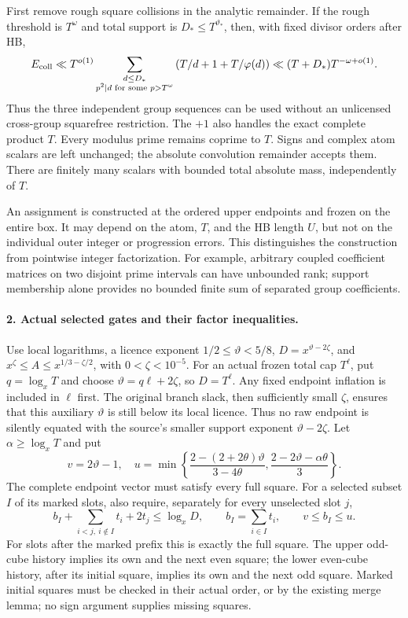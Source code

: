 First remove rough square collisions in the analytic remainder. If the
rough threshold is $T^\omega$ and total support is $D_*\le T^{\vartheta_*}$,
then, with fixed divisor orders after HB,
\[
 E_{\rm coll}\ll T^{o(1)}
 \sum_{\substack{d\le D_*\\p^2\mid d\text{ for some }p>T^\omega}}
 \left(T/d+1+T/\varphi(d)\right)
 \ll (T+D_*)T^{-\omega+o(1)}.
\]
Thus the three independent group sequences can be used without an
unlicensed cross-group squarefree restriction. The $+1$ also handles
the exact complete product $T$. Every modulus prime remains coprime to
$T$. Signs and complex atom scalars are left unchanged; the absolute
convolution remainder accepts them. There are finitely many scalars with
bounded total absolute mass, independently of $T$.

An assignment is constructed at the ordered upper endpoints and frozen
on the entire box. It may depend on the atom, $T$, and the HB length $U$,
but not on the individual outer integer or progression errors. This
distinguishes the construction from pointwise integer factorization.
For example, arbitrary coupled coefficient matrices on two disjoint
prime intervals can have unbounded rank; support membership alone
provides no bounded finite sum of separated group coefficients.

\paragraph{2. Actual selected gates and their factor inequalities.}
Use local logarithms, a licence exponent $1/2\le\vartheta<5/8$,
$D=x^{\vartheta-2\zeta}$, and
$x^\zeta\le A\le x^{1/3-\zeta/2}$, with $0<\zeta<10^{-5}$.
For an actual frozen total cap $T^\ell$, put $q=\log_xT$ and choose
$\vartheta=q\ell+2\zeta$, so $D=T^\ell$. Any fixed endpoint inflation
is included in $\ell$ first. The original branch slack, then sufficiently
small $\zeta$, ensures that this auxiliary $\vartheta$ is still below
its local licence. Thus no raw endpoint is silently equated with the
source's smaller support exponent $\vartheta-2\zeta$.
Let $\alpha\ge\log_x T$ and put
\[
 v=2\vartheta-1,\quad
 u=\min\left\{\frac{2-(2+2\theta)\vartheta}{3-4\theta},
                 \frac{2-2\vartheta-\alpha\theta}{3}\right\}.
\]
The complete endpoint vector must satisfy every full square. For a
selected subset $I$ of its marked slots, also require, separately for
every unselected slot $j$,
\[
 b_I+\sum_{i<j,\ i\notin I}t_i+2t_j\le\log_xD,
 \qquad b_I=\sum_{i\in I}t_i,\qquad v\le b_I\le u.       \tag{H1}
\]
For slots after the marked prefix this is exactly the full square.
The upper odd-cube history implies its own and the next even square;
the lower even-cube history, after its initial square, implies its own
and the next odd square. Marked initial squares must be checked in
their actual order, or by the existing merge lemma; no sign argument
supplies missing squares.

